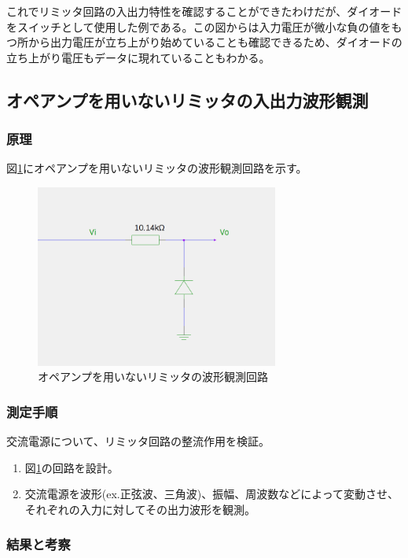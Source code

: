 \documentclass[11pt,a4j]{jsarticle}
\begin{document}
    これでリミッタ回路の入出力特性を確認することができたわけだが、ダイオードをスイッチとして使用した例である。この図からは入力電圧が微小な負の値をもつ所から出力電圧が立ち上がり始めていることも確認できるため、ダイオードの立ち上がり電圧もデータに現れていることもわかる。
    
  \subsection{オペアンプを用いないリミッタの入出力波形観測}
   \subsubsection{原理}
    
    図\ref{fig:noamp_wave}にオペアンプを用いないリミッタの波形観測回路を示す。
    
    \begin{figure}[htbp]
  \centering
  \includegraphics[width=8cm,clip]{noamp_wave.png}
  \caption{オペアンプを用いないリミッタの波形観測回路}
  \label{fig:noamp_wave}
 \end{figure}%
    
   \subsubsection{測定手順}
    交流電源について、リミッタ回路の整流作用を検証。
    \begin{enumerate}
    \item 図\ref{fig:noamp_wave}の回路を設計。
    \item 交流電源を波形(ex.正弦波、三角波)、振幅、周波数などによって変動させ、それぞれの入力に対してその出力波形を観測。
    \end{enumerate}
    
   \subsubsection{結果と考察}
    
\end{document}
